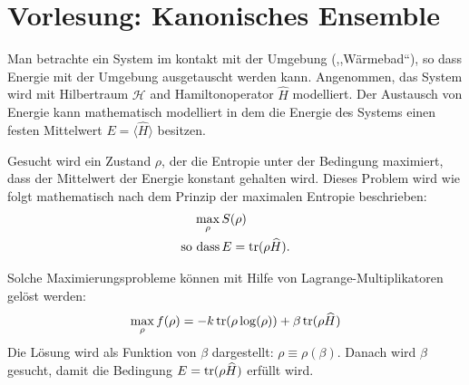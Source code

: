 

\section{Vorlesung: Kanonisches Ensemble}
Man betrachte ein System im kontakt mit der Umgebung (,,Wärmebad``), so dass Energie mit der Umgebung ausgetauscht werden kann. Angenommen, das System wird mit Hilbertraum $\mathcal{H}$ and Hamiltonoperator $\widehat{H}$ modelliert. Der Austausch von Energie kann mathematisch modelliert in dem die Energie des Systems einen festen Mittelwert $E = \langle \widehat{H}\rangle$ besitzen.

Gesucht wird ein Zustand $\rho$, der die Entropie unter der Bedingung maximiert, dass der Mittelwert der Energie konstant gehalten wird. Dieses Problem wird wie folgt mathematisch nach dem Prinzip der maximalen Entropie beschrieben:
\begin{equation}
	\begin{split}
		\max_{\rho} &\,S(\rho) \\
		\text{so dass} &\, E=\operatorname{tr}(\rho \widehat{H}).
	\end{split}
\end{equation}

Solche Maximierungsprobleme können mit Hilfe von Lagrange-Multiplikatoren gelöst werden: 
\begin{equation}
	\max_{\rho} f(\rho) = -k\operatorname{tr}(\rho\log(\rho)) + \beta \operatorname{tr}(\rho \widehat{H})
\end{equation}
Die Lösung wird als Funktion von $\beta$ dargestellt: $\rho \equiv \rho(\beta)$. Danach wird $\beta$ gesucht, damit die Bedingung $E=\operatorname{tr}(\rho \widehat{H})$ erfüllt wird. 

